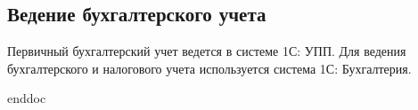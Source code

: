 \newpage
\subsection{Ведение бухгалтерского учета}
Первичный бухгалтерский учет ведется в системе 1С: УПП.
Для ведения бухгалтерского и налогового учета используется система 1С: Бухгалтерия.

 {enddoc}